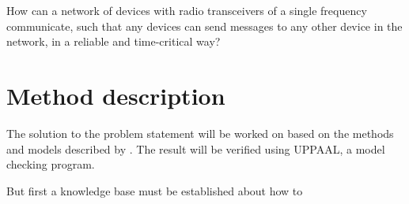 
\bigskip

{\addtolength{\leftskip}{10mm}\addtolength{\rightskip}{10mm}\noindent\hrulefill\it

\noindent How can a network of devices with radio transceivers of a single frequency communicate, such that any devices can send messages to any other device in the network, in a reliable and time-critical way?

\noindent\hrulefill

}

\section{Method description}

The solution to the problem statement will be worked on based on the methods and models described by . The result will be verified using UPPAAL, a model checking program.

But first a knowledge base must be established about how to 